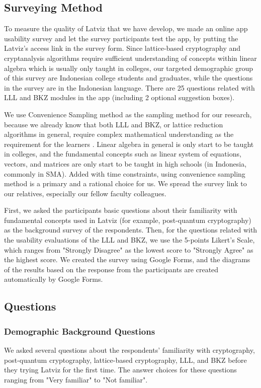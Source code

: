 \documentclass[runningheads]{llncs}
\begin{document}
\subsection{Surveying Method}
To measure the quality of Latviz that we have develop, we made an online app usability survey and let the survey participants test the app, by putting the Latviz's access link in the survey form. Since lattice-based cryptography and cryptanalysis algorithms require sufficient understanding of concepts within linear algebra which is usually only taught in colleges, our targeted demographic group of this survey are Indonesian college students and graduates, while the questions in the survey are in the Indonesian language. There are 25 questions related with LLL and BKZ modules in the app (including 2 optional suggestion boxes). 

We use Convenience Sampling method as the sampling method for our research, because we already know that both LLL and BKZ, or lattice reduction algorithms in general, require complex mathematical understanding as the requirement for the learners \cite{16}. Linear algebra in general is only start to be taught in colleges, and the fundamental concepts such as linear system of equations, vectors, and matrices are only start to be taught in high schools (in Indonesia, commonly in SMA). Added with time constraints, using convenience sampling method is a primary and a rational choice for us. We spread the survey link to our relatives, especially our fellow faculty colleagues. 

First, we asked the participants basic questions about their familiarity with fundamental concepts used in Latviz (for example, post-quantum cryptography) as the background survey of the respondents. Then, for the questions related with the usability evaluations of the LLL and BKZ, we use the 5-points Likert's Scale, which ranges from "Strongly Disagree" as the lowest score to "Strongly Agree" as the highest score. We created the survey using Google Forms, and the diagrams of the results based on the response from the participants are created automatically by Google Forms.

\subsection{Questions}
\subsubsection{Demographic Background Questions}
We asked several questions about the respondents' familiarity with cryptography, post-quantum cryptography, lattice-based cryptography, LLL, and BKZ before they trying Latviz for the first time. The answer choices for these questions ranging from "Very familiar" to "Not familiar". 
\end{document}

